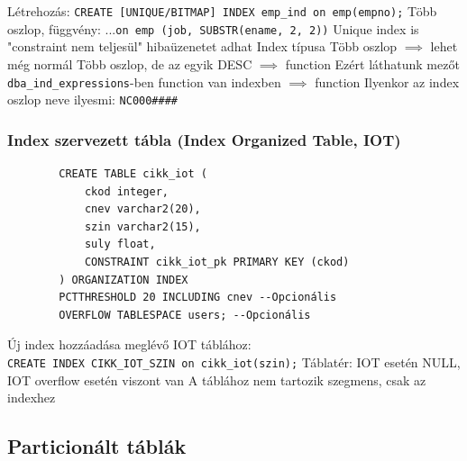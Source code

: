 \documentclass[12pt,a4paper]{article}
\begin{document}
\begin{outline}
	\1 Létrehozás: \texttt{CREATE [UNIQUE/BITMAP] INDEX emp\_ind on emp(empno);}
		\2 Több oszlop, függvény: ...\texttt{on emp (job, SUBSTR(ename, 2, 2))}
	\1 Unique index is "constraint nem teljesül" hibaüzenetet adhat
	\1 Index típusa
		\2 Több oszlop $\implies$ lehet még normál
		\2 Több oszlop, de az egyik DESC $\implies$ function
			\3 Ezért láthatunk mezőt \texttt{dba\_ind\_expressions}-ben
		\2 function van indexben $\implies$ function
			\3 Ilyenkor az index oszlop neve ilyesmi: \texttt{NC000\#\#\#\#}
\end{outline}

\subsubsection{Index szervezett tábla (Index Organized Table, IOT)}

\begin{outline}
	\1 \begin{verbatim}
		CREATE TABLE cikk_iot (
		    ckod integer,
		    cnev varchar2(20),
		    szin varchar2(15),
		    suly float,
		    CONSTRAINT cikk_iot_pk PRIMARY KEY (ckod)
		) ORGANIZATION INDEX
		PCTTHRESHOLD 20 INCLUDING cnev --Opcionális
		OVERFLOW TABLESPACE users; --Opcionális
	\end{verbatim}
	\1 Új index hozzáadása meglévő IOT táblához:\\
	\texttt{CREATE INDEX CIKK\_IOT\_SZIN on cikk\_iot(szin);}
	\1 Táblatér: IOT esetén NULL, IOT overflow esetén viszont van
	\1 A táblához nem tartozik szegmens, csak az indexhez
\end{outline}

\pagebreak

\subsection{Particionált táblák}
\end{document}
